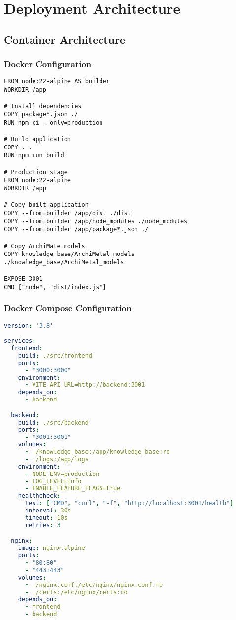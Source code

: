 \documentclass[12pt,a4paper]{report}
\begin{document}
\chapter{Deployment Architecture}

\section{Container Architecture}

\subsection{Docker Configuration}

\begin{lstlisting}[language=Docker, caption=Dockerfile for Backend]
FROM node:22-alpine AS builder
WORKDIR /app

# Install dependencies
COPY package*.json ./
RUN npm ci --only=production

# Build application
COPY . .
RUN npm run build

# Production stage
FROM node:22-alpine
WORKDIR /app

# Copy built application
COPY --from=builder /app/dist ./dist
COPY --from=builder /app/node_modules ./node_modules
COPY --from=builder /app/package*.json ./

# Copy ArchiMate models
COPY knowledge_base/ArchiMetal_models ./knowledge_base/ArchiMetal_models

EXPOSE 3001
CMD ["node", "dist/index.js"]
\end{lstlisting}

\subsection{Docker Compose Configuration}

\begin{lstlisting}[language=YAML, caption=docker-compose.yml]
version: '3.8'

services:
  frontend:
    build: ./src/frontend
    ports:
      - "3000:3000"
    environment:
      - VITE_API_URL=http://backend:3001
    depends_on:
      - backend

  backend:
    build: ./src/backend
    ports:
      - "3001:3001"
    volumes:
      - ./knowledge_base:/app/knowledge_base:ro
      - ./logs:/app/logs
    environment:
      - NODE_ENV=production
      - LOG_LEVEL=info
      - ENABLE_FEATURE_FLAGS=true
    healthcheck:
      test: ["CMD", "curl", "-f", "http://localhost:3001/health"]
      interval: 30s
      timeout: 10s
      retries: 3

  nginx:
    image: nginx:alpine
    ports:
      - "80:80"
      - "443:443"
    volumes:
      - ./nginx.conf:/etc/nginx/nginx.conf:ro
      - ./certs:/etc/nginx/certs:ro
    depends_on:
      - frontend
      - backend
\end{lstlisting}
\end{document}
